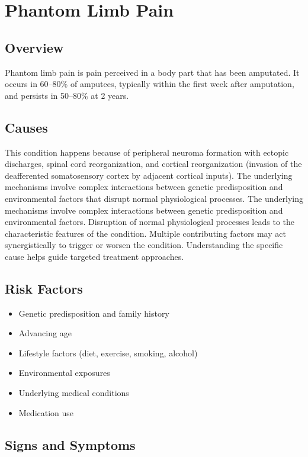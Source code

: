 \chapter{Phantom Limb Pain}
\label{sec:Phantom Limb Pain}

\section{Overview}
Phantom limb pain is pain perceived in a body part that has been amputated. It occurs in 60--80\% of amputees, typically within the first week after amputation, and persists in 50--80\% at 2 years.
\section{Causes}
This condition happens because of peripheral neuroma formation with ectopic discharges, spinal cord reorganization, and cortical reorganization (invasion of the deafferented somatosensory cortex by adjacent cortical inputs). The underlying mechanisms involve complex interactions between genetic predisposition and environmental factors that disrupt normal physiological processes. The underlying mechanisms involve complex interactions between genetic predisposition and environmental factors. Disruption of normal physiological processes leads to the characteristic features of the condition. Multiple contributing factors may act synergistically to trigger or worsen the condition. Understanding the specific cause helps guide targeted treatment approaches.
\section{Risk Factors}


\begin{itemize}[noitemsep]
  \item Genetic predisposition and family history
  \item Advancing age
  \item Lifestyle factors (diet, exercise, smoking, alcohol)
  \item Environmental exposures
  \item Underlying medical conditions
  \item Medication use
\end{itemize}
\section{Signs and Symptoms}

